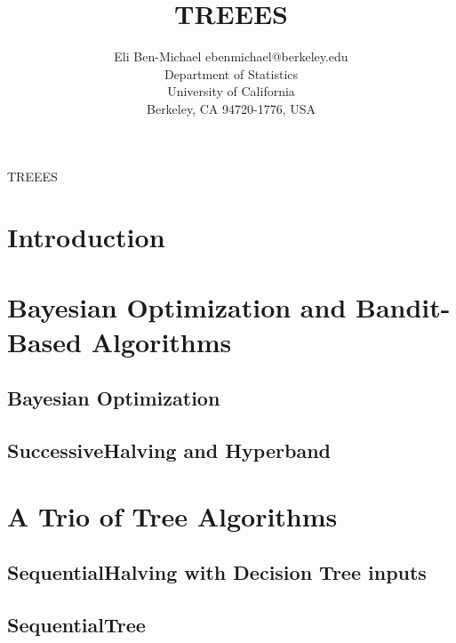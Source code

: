 \documentclass[twoside,11pt]{article}
\newcommand{\1}{\ensuremath{\mathbbm{1}}}
\newcommand{\<}{\langle}
\renewcommand{\>}{\rangle}
\begin{document}
\title{TREEES}

\author{\name Eli Ben-Michael \email ebenmichael@berkeley.edu \\
       \addr Department of Statistics\\
       University of California\\
       Berkeley, CA 94720-1776, USA}

\editor{}

\maketitle

\begin{abstract}%
  \blindtext[1]
\end{abstract}

\begin{keywords}
  TREEES
\end{keywords}

\section{Introduction}
\blindtext[1]
\section{Bayesian Optimization and Bandit-Based Algorithms}

\subsection{Bayesian Optimization}

\subsection{SuccessiveHalving and Hyperband}

\section{A Trio of Tree Algorithms}

\subsection{SequentialHalving with Decision Tree inputs}

\subsection{SequentialTree}
\end{document}
